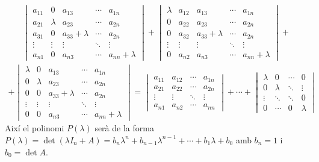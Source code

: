 \documentclass[11pt,a4paper]{article}
\begin{document}
\begin{enumerate}
\begin{multline*}
\begin{vmatrix}
      a_{11} & 0 & a_{13} &\cdots & a_{1n} \\
      a_{21} & \lambda & a_{23} & \cdots & a_{2n} \\
      a_{31} & 0 & a_{33}+\lambda & \cdots & a_{2n} \\
      \vdots & \vdots & \vdots & \ddots & \vdots \\
      a_{n1} & 0 & a_{n3}& \cdots & a_{nn}+\lambda
   \end{vmatrix}+\begin{vmatrix}
      \lambda & a_{12} & a_{13} &\cdots & a_{1n} \\
      0 & a_{22} & a_{23} & \cdots & a_{2n} \\
      0 & a_{32} & a_{33}+\lambda & \cdots & a_{2n} \\
      \vdots & \vdots & \vdots & \ddots & \vdots \\
      0 & a_{n2} & a_{n3}& \cdots & a_{nn}+\lambda
   \end{vmatrix}+\end{multline*}\begin{multline*}+\begin{vmatrix}
      \lambda & 0 & a_{13} &\cdots & a_{1n} \\
      0 & \lambda & a_{23} & \cdots & a_{2n} \\
      0 & 0 & a_{33}+\lambda & \cdots & a_{2n} \\
      \vdots & \vdots & \vdots & \ddots & \vdots \\
      0 & 0 & a_{n3}& \cdots & a_{nn}+\lambda
   \end{vmatrix}=\begin{vmatrix}
      a_{11} & a_{12} &\cdots & a_{1n} \\
      a_{21} & a_{22} & \cdots & a_{2n} \\
      \vdots & \vdots & \ddots & \vdots \\
      a_{n1} & a_{n2} & \cdots & a_{nn}
   \end{vmatrix}+\cdots+\begin{vmatrix}
      \lambda & 0 &\cdots & 0 \\
      0 & \lambda & \ddots & \vdots \\
      \vdots & \ddots & \ddots & 0 \\
      0 & \cdots & 0 & \lambda
   \end{vmatrix}
    \end{multline*}
    Així el polinomi $P(\lambda)$ serà de la forma $P(\lambda)=\det (\lambda I_n+A)=b_n\lambda^n+b_{n-1}\lambda^{n-1}+\cdots+b_1\lambda+b_0$ amb $b_n=1$ i $b_0=\det A$.\par

\end{enumerate}
\end{document}
